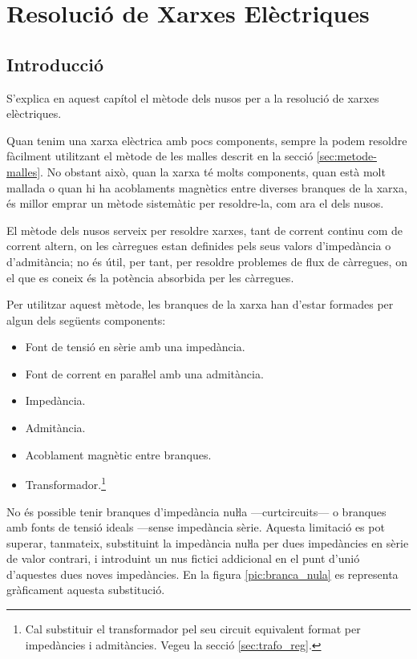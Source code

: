
\chapter{Resolució de Xarxes Elèctriques} \label{sec:ch-xarxes-elec}
\section{Introducció}\label{sec:ch-xarxes-elec-intro}
S'explica en aquest capítol el
mètode dels nusos per a la resolució de xarxes elèctriques.

Quan tenim una xarxa elèctrica amb pocs components, sempre la podem resoldre fàcilment
utilitzant el mètode de les malles descrit en la secció \vref{sec:metode-malles}. No obstant això, quan la xarxa té molts components, quan està
 molt mallada o quan hi ha acoblaments magnètics entre diverses branques de la xarxa, és millor
 emprar un mètode sistemàtic per  resoldre-la, com ara el  dels nusos.

El mètode dels nusos serveix per resoldre xarxes, tant de corrent
continu com de corrent altern, on les càrregues estan definides pels
seus valors d'impedància o d'admitància; no és útil, per tant, per
resoldre problemes de flux de càrregues, on el que es coneix és la
potència absorbida per les càrregues.

Per utilitzar aquest mètode, les branques de la xarxa han d'estar
formades per algun dels següents components: \vspace{-1.5mm}
\begin{itemize}
   \item Font de tensió en sèrie amb una impedància.
   \item Font de corrent en paraŀlel amb una admitància.
   \item Impedància.
   \item Admitància.
   \item Acoblament magnètic entre branques.
   \item Transformador.\footnote{Cal substituir el transformador pel seu circuit equivalent format per impedàncies i    admitàncies. Vegeu la secció \ref{sec:trafo_reg}.}
\end{itemize}
\vspace{-1.5mm}

No és possible tenir branques d'impedància nuŀla ---curtcircuits--- o
branques amb fonts de tensió ideals  ---sense impedància sèrie.
Aquesta limitació es pot superar, tanmateix, substituint la
impedància nuŀla per dues impedàncies en sèrie  de valor
contrari, i introduint un nus fictici addicional en el punt d'unió
d'aquestes dues noves impedàncies. En la figura
\vref{pic:branca_nula}
 es representa gràficament aquesta substitució. 
\begin{center}
   
    \label{pic:branca_nula}
\end{center}

